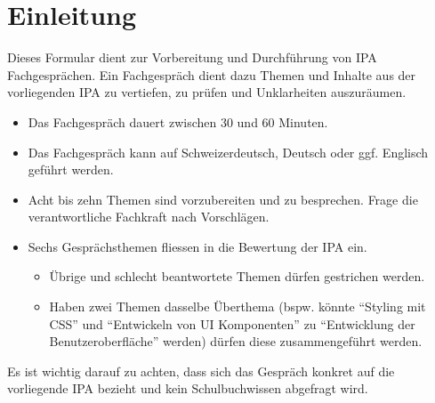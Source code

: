 \section{Einleitung}

Dieses Formular dient zur Vorbereitung und Durchführung von IPA Fachgesprächen. Ein Fachgespräch dient dazu Themen und Inhalte aus der vorliegenden IPA zu vertiefen, zu prüfen und Unklarheiten auszuräumen.

\begin{itemize}
  \item Das Fachgespräch dauert zwischen 30 und 60 Minuten.
  \item Das Fachgespräch kann auf Schweizerdeutsch, Deutsch oder ggf. Englisch geführt werden.
  \item Acht bis zehn Themen sind vorzubereiten und zu besprechen. Frage die verantwortliche Fachkraft nach Vorschlägen.
  \item Sechs Gesprächsthemen fliessen in die Bewertung der IPA ein.
  \begin{itemize}
    \item Übrige und schlecht beantwortete Themen dürfen gestrichen werden.
    \item Haben zwei Themen dasselbe Überthema (bspw. könnte \enquote{Styling mit CSS} und \enquote{Entwickeln von UI Komponenten} zu \enquote{Entwicklung der Benutzeroberfläche} werden) dürfen diese zusammengeführt werden.
  \end{itemize}
\end{itemize}

Es ist wichtig darauf zu achten, dass sich das Gespräch konkret auf die vorliegende IPA bezieht und kein Schulbuchwissen abgefragt wird.

